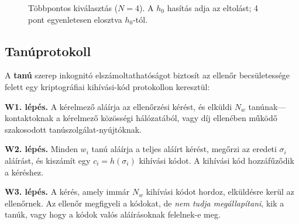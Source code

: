 \documentclass[11pt,a4paper,twocolumn]{article}
\begin{document}
\begin{figure}[ht]
\centering
{}
\caption{Többpontos kiválasztás ($N{=}4$). A $h_0$ hasítás adja az eltolást; 4 pont egyenletesen elosztva $h_0$-tól.}
\label{fig:multipoint}
\end{figure}

\subsection{Tanúprotokoll}

A \textbf{tanú} szerep inkognitó elszámoltathatóságot biztosít az ellenőr becsületessége felett egy kriptográfiai kihívási-kód protokollon keresztül:

\textbf{W1. lépés.} A kérelmező aláírja az ellenőrzési kérést, és elküldi $N_w$ tanúnak---kontaktoknak a kérelmező közösségi hálózatából, vagy díj ellenében működő szakosodott tanúszolgálat-nyújtóknak.

\textbf{W2. lépés.} Minden $w_i$ tanú aláírja a teljes aláírt kérést, megőrzi az eredeti $\sigma_i$ aláírást, és kiszámít egy $c_i = h(\sigma_i)$ kihívási kódot. A kihívási kód hozzáfűződik a kéréshez.

\textbf{W3. lépés.} A kérés, amely immár $N_w$ kihívási kódot hordoz, elküldésre kerül az ellenőrnek. Az ellenőr megfigyeli a kódokat, de \emph{nem tudja megállapítani}, kik a tanúk, vagy hogy a kódok valós aláírásoknak felelnek-e meg.
\end{document}
